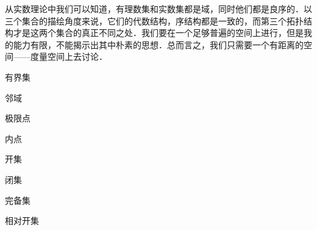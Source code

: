



从实数理论中我们可以知道，有理数集和实数集都是域，同时他们都是良序的．以三个集合的描绘角度来说，它们的代数结构，序结构都是一致的，而第三个拓扑结构才是这两个集合的真正不同之处．我们要在一个足够普遍的空间上进行，但是我的能力有限，不能揭示出其中朴素的思想．总而言之，我们只需要一个有距离的空间——度量空间上去讨论．

\begin{definition}{有界集}

\end{definition}


\begin{definition}{邻域}

\end{definition}


\begin{definition}{极限点}

\end{definition}



\begin{definition}{内点}

\end{definition}


\begin{definition}{开集}

\end{definition}


\begin{definition}{闭集}

\end{definition}


\begin{definition}{完备集}

\end{definition}


\begin{definition}{相对开集}

\end{definition}